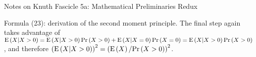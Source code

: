 \def\newstep#1{\smallskip \noindent {\bf #1}}
\def\newhead#1{\vskip 0.1in \noindent {\bf #1}}

\topglue 0.5in
\centerline{Notes on Knuth Fascicle 5a: Mathematical Preliminaries Redux}
\vskip 0.3in


\noindent [p 5] Formula (23): derivation of the second moment principle.  The
final step again takes advantage of ${\rm E}\left(X | X > 0\right) = {\rm E} \left(X | X > 0\right)
{\rm Pr}\left(X > 0\right) + {\rm E} \left(X | X = 0\right) {\rm Pr}\left(X = 0\right) = {\rm E} \left(X | X > 0\right)
{\rm Pr}\left(X > 0\right)$, and therefore $\left( {\rm E} \left(X | X > 0\right) \right)^2 = 
\left({\rm E} \left(X \right) / {\rm Pr}\left(X > 0\right) \right)^2$.

\bye